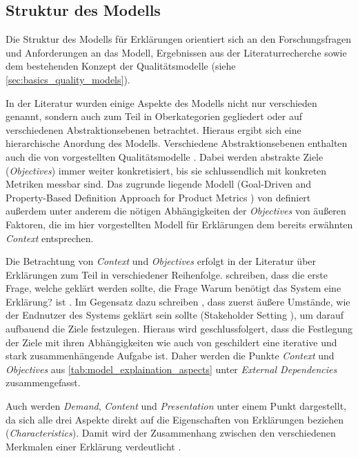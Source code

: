 \subsection{Struktur des Modells}

Die Struktur des Modells für Erklärungen orientiert sich an den Forschungsfragen und Anforderungen an das Modell, Ergebnissen aus der Literaturrecherche sowie dem bestehenden Konzept der Qualitätsmodelle \cite{schneider2012abenteuer} (siehe \autoref{sec:basics_quality_models}).

In der Literatur wurden einige Aspekte des Modells nicht nur verschieden genannt, sondern auch zum Teil in Oberkategorien gegliedert oder auf verschiedenen Abstraktionsebenen betrachtet. Hieraus ergibt sich eine hierarchische Anordung des Modells. Verschiedene Abstraktionsebenen enthalten auch die von \citeauthor{schneider2012abenteuer} vorgestellten Qualitätsmodelle \cite{schneider2012abenteuer}. Dabei werden abstrakte Ziele (\textit{Objectives}) immer weiter konkretisiert, bis sie schlussendlich mit konkreten Metriken messbar sind. Das zugrunde liegende Modell (\glqq Goal-Driven and Property-Based Definition Approach for Product Metrics\grqq{} \cite{briand1995goal}) von \citeauthor{briand1995goal} definiert außerdem unter anderem die nötigen Abhängigkeiten der \textit{Objectives} von äußeren Faktoren, die im hier vorgestellten Modell für Erklärungen dem bereits erwähnten \textit{Context} entsprechen.

Die Betrachtung von \textit{Context} und \textit{Objectives} erfolgt in der Literatur über Erklärungen zum Teil in verschiedener Reihenfolge. \citeauthor{rosenfeld_explainability_2019} schreiben, dass die erste Frage, welche geklärt werden sollte, die Frage \glqq Warum benötigt das System eine Erklärung?\grqq{} ist \cite[vgl. S. 699][]{rosenfeld_explainability_2019}\cite{nunes_systematic_2017}. Im Gegensatz dazu schreiben \citeauthor{cirqueira_scenario-based_2020}, dass zuerst äußere Umstände, wie der Endnutzer des Systems geklärt sein sollte (\glqq Stakeholder Setting\grqq{} \cite{cirqueira_scenario-based_2020}), um darauf aufbauend die Ziele festzulegen. Hieraus wird geschlussfolgert, dass die Festlegung der Ziele mit ihren Abhängigkeiten wie auch von \cite{schneider2012abenteuer} geschildert eine iterative und stark zusammenhängende Aufgabe ist. Daher werden die Punkte \textit{Context} und \textit{Objectives} aus \autoref{tab:model_explaination_aspects} unter \textit{External Dependencies} zusammengefasst.

Auch werden \textit{Demand}, \textit{Content} und \textit{Presentation} unter einem Punkt dargestellt, da sich alle drei Aspekte direkt auf die Eigenschaften von Erklärungen beziehen (\textit{Characteristics}). Damit wird der Zusammenhang zwischen den verschiedenen Merkmalen einer Erklärung verdeutlicht \cite{nunes_systematic_2017}.

